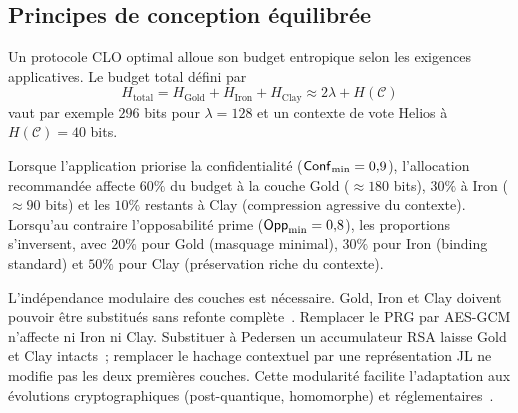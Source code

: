 \subsection{Principes de conception \'equilibr\'ee}
\label{subsec:principes_conception}
\begin{sloppypar}
Un protocole CLO optimal alloue son budget entropique selon les exigences
applicatives. Le budget total d\'efini par
\begin{equation}
H_{\text{total}} = H_{\text{Gold}} + H_{\text{Iron}} + H_{\text{Clay}} \approx 2\lambda + H(\mathcal{C})
\label{eq:entropy_budget_clo}
\end{equation}
vaut par exemple $296$ bits pour $\lambda = 128$ et un contexte de vote
Helios \`a $H(\mathcal{C}) = 40$ bits.

Lorsque l'application priorise la confidentialit\'e ($\mathsf{Conf}_{\min} = 0{,}9$),
l'allocation recommand\'ee affecte $60\%$ du budget \`a la couche Gold
($\approx 180$ bits), $30\%$ \`a Iron ($\approx 90$ bits) et les
$10\%$ restants \`a Clay (compression agressive du contexte). Lorsqu'au
contraire l'opposabilit\'e prime ($\mathsf{Opp}_{\min} = 0{,}8$), les proportions
s'inversent, avec $20\%$ pour Gold (masquage minimal), $30\%$ pour Iron
(binding standard) et $50\%$ pour Clay (pr\'eservation riche du contexte).

L'ind\'ependance modulaire des couches est n\'ecessaire. Gold, Iron et Clay
doivent pouvoir \^etre substitu\'es sans refonte compl\`ete~\cite{canetti2001,Goldreich02}. Remplacer le PRG
par AES-GCM n'affecte ni Iron ni Clay. Substituer \`a Pedersen un
accumulateur RSA laisse Gold et Clay intacts~; remplacer le hachage
contextuel par une repr\'esentation JL ne modifie pas les deux premi\`eres
couches. Cette modularit\'e facilite l'adaptation aux \'evolutions
cryptographiques (post-quantique, homomorphe) et r\'eglementaires~\cite{NISTPQC,Kyber2022,Dilithium2022}.
\end{sloppypar}

